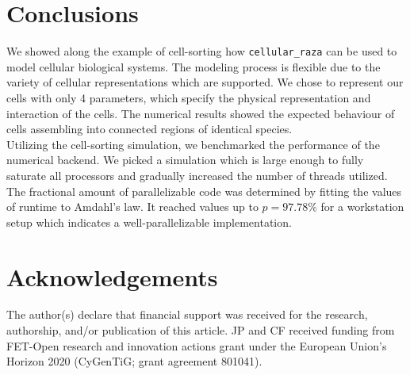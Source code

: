 \documentclass[fontsize=11pt,a4paper]{article}
\begin{document}
\section{Conclusions}\label{conclusions}

We showed along the example of cell-sorting how \texttt{cellular\_raza} can be used to model
cellular biological systems.
The modeling process is flexible due to the variety of cellular representations which are supported.
We chose to represent our cells with only 4 parameters, which specify the physical representation
and interaction of the cells.
The numerical results showed the expected behaviour of cells assembling into connected regions of
identical species.\\
Utilizing the cell-sorting simulation, we benchmarked the performance of the numerical backend.
We picked a simulation which is large enough to fully saturate all processors and gradually
increased the number of threads utilized.
The fractional amount of parallelizable code was determined by fitting the values of runtime to
Amdahl's law.
It reached values up to $p=97.78\%$ for a workstation setup which indicates a well-parallelizable
implementation.

\section{Acknowledgements} 

The author(s) declare that financial support was received for the research, authorship, and/or
publication of this article.
JP and CF received funding from FET-Open research and innovation actions grant
under the European Union’s Horizon 2020 (CyGenTiG; grant agreement 801041).



\end{document}
